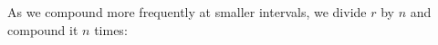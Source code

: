 \documentclass[preview]{standalone}
\begin{document}
\begin{center}
As we compound more frequently at smaller intervals, we divide $r$ by $n$ and compound it $n$ times:
\end{center}
\end{document}

